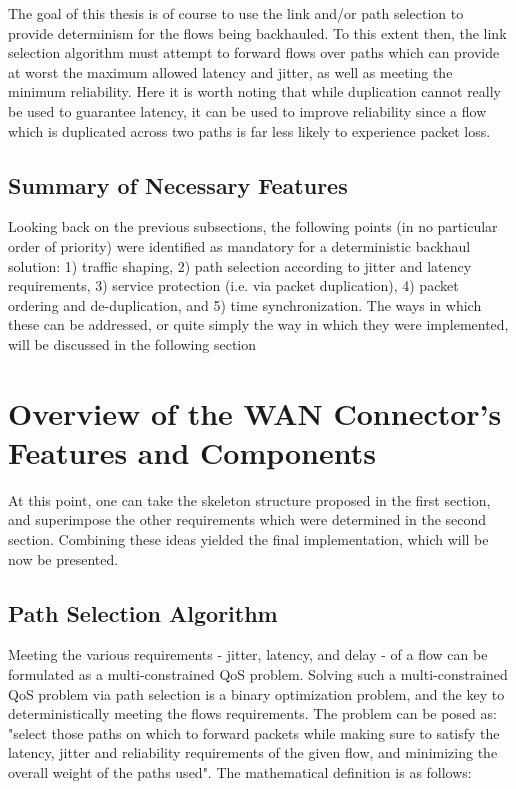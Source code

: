 The goal of this thesis is of course to use the link and/or path selection to provide determinism for the flows being backhauled. To this extent then, the link selection algorithm must attempt to forward flows over paths which can provide at worst the maximum allowed latency and jitter, as well as meeting the minimum reliability. Here it is worth noting that while duplication cannot really be used to guarantee latency, it can be used to improve reliability since a flow which is duplicated across two paths is far less likely to experience packet loss.

\subsection{Summary of Necessary Features}


Looking back on the previous subsections, the following points (in no particular order of priority) were identified as mandatory for a deterministic backhaul solution: 1) traffic shaping, 2) path selection according to jitter and latency requirements, 3) service protection (i.e. via packet duplication), 4) packet ordering and de-duplication, and 5) time synchronization. The ways in which these can be addressed, or quite simply the way in which they were implemented, will be discussed in the following section

\section{Overview of the WAN Connector's Features and Components}
\label{sec:approach:arch}

At this point, one can take the skeleton structure proposed in the first section, and superimpose the other requirements which were determined in the second section. Combining these ideas yielded the final implementation, which will be now be presented.

\subsection{Path Selection Algorithm}

Meeting the various requirements - jitter, latency, and delay - of a flow can be formulated as a multi-constrained QoS problem. Solving such a multi-constrained QoS problem via path selection is a binary optimization problem, and the key to deterministically meeting the flows requirements. The problem can be posed as: "select those paths on which to forward packets while making sure to satisfy the latency, jitter and reliability requirements of the given flow, and minimizing the overall weight of the paths used". The mathematical definition is as follows:

